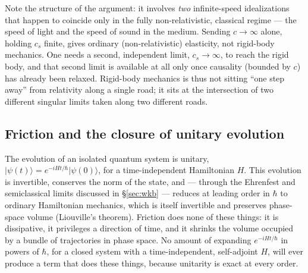 Note the structure of the argument: it involves \emph{two} infinite-speed
idealizations that happen to coincide only in the fully non-relativistic,
classical regime --- the speed of light and the speed of sound in the medium.
Sending $c\to\infty$ alone, holding $c_s$ finite, gives ordinary
(non-relativistic) elasticity, not rigid-body mechanics. One needs a second,
independent limit, $c_s\to\infty$, to reach the rigid body, and that second
limit is available at all only once causality (bounded by $c$) has already been
relaxed. Rigid-body mechanics is thus not sitting ``one step away'' from
relativity along a single road; it sits at the intersection of two different
singular limits taken along two different roads.

\subsection{Friction and the closure of unitary evolution}
\label{sec:friction}

The evolution of an isolated quantum system is unitary, 
$\lvert\psi(t)\rangle =e^{-iHt/\hbar}\lvert\psi(0)\rangle$, 
for a time-independent Hamiltonian $H$.
This evolution is invertible, conserves the norm of the state, and --- through
the Ehrenfest and semiclassical limits discussed in \S\ref{sec:wkb} --- reduces
at leading order in $\hbar$ to ordinary Hamiltonian mechanics, which is itself
invertible and preserves phase-space volume (Liouville's theorem). Friction
does none of these things: it is dissipative, it privileges a direction of
time, and it shrinks the volume occupied by a bundle of trajectories in phase
space. No amount of expanding $e^{-iHt/\hbar}$ in powers of $\hbar$, for a
closed system with a time-independent, self-adjoint $H$, will ever produce a
term that does these things, because unitarity is exact at every order.

